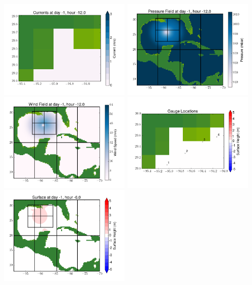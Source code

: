 \documentclass[11pt]{article}
\begin{document}
\vskip 10pt 
\includegraphics[width=0.475\textwidth]{frame0006fig7.png}
\includegraphics[width=0.475\textwidth]{frame0006fig8.png}
\vskip 10pt 
\includegraphics[width=0.475\textwidth]{frame0006fig9.png}
\includegraphics[width=0.475\textwidth]{frame0006fig10.png}
\vskip 10pt 
\includegraphics[width=0.475\textwidth]{frame0007fig1.png}
\end{document}
